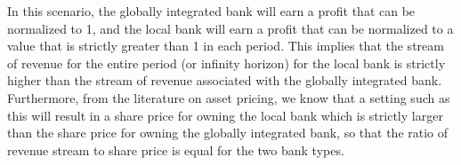 \par In this scenario, the globally integrated bank will earn a profit that can be normalized to 1, and the local bank will earn a profit that can be normalized to a value that is strictly greater than 1 in each period. This implies that the stream of revenue for the entire period (or infinity horizon) for the local bank is strictly higher than the stream of revenue associated with the globally integrated bank. Furthermore, from the literature on asset pricing, we know that a setting such as this will result in a share price for owning the local bank which is strictly larger than the share price for owning the globally integrated bank, so that the ratio of revenue stream to share price is equal for the two bank types.

\par

\par